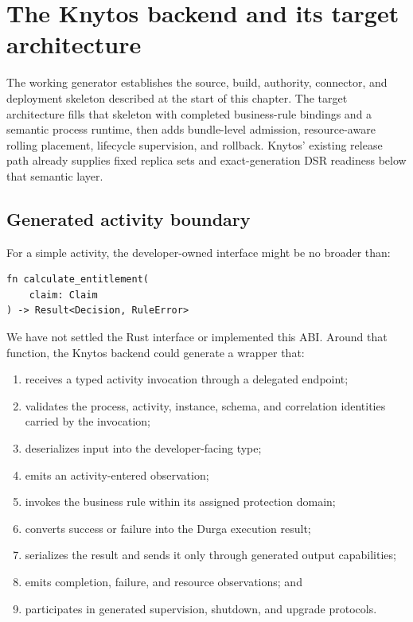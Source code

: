 \section{The Knytos backend and its target architecture}

The working generator establishes the source, build, authority, connector, and
deployment skeleton described at the start of this chapter. The target
architecture fills that skeleton with completed business-rule bindings and a
semantic process runtime, then adds bundle-level admission, resource-aware
rolling placement, lifecycle supervision, and rollback. Knytos' existing
release path already supplies fixed replica sets and exact-generation DSR
readiness below that semantic layer.

\subsection{Generated activity boundary}

For a simple activity, the developer-owned interface might be no broader than:

\begin{lstlisting}[style=rustCode]
fn calculate_entitlement(
    claim: Claim
) -> Result<Decision, RuleError>
\end{lstlisting}

We have not settled the Rust interface or implemented this ABI. Around that
function, the Knytos backend could generate a wrapper that:

\begin{enumerate}
    \item receives a typed activity invocation through a delegated endpoint;
    \item validates the process, activity, instance, schema, and correlation
        identities carried by the invocation;
    \item deserializes input into the developer-facing type;
    \item emits an activity-entered observation;
    \item invokes the business rule within its assigned protection domain;
    \item converts success or failure into the Durga execution result;
    \item serializes the result and sends it only through generated output
        capabilities;
    \item emits completion, failure, and resource observations; and
    \item participates in generated supervision, shutdown, and upgrade
        protocols.
\end{enumerate}

